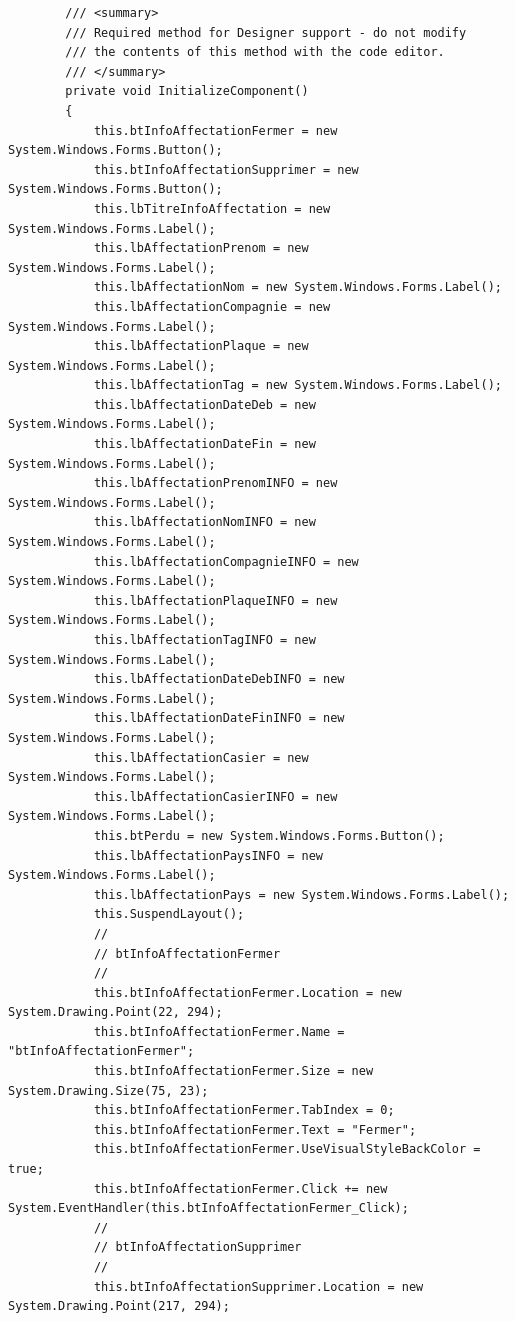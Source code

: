\documentclass[main.tex]{subfiles}
\begin{document}
\begin{lstlisting}
        /// <summary>
        /// Required method for Designer support - do not modify
        /// the contents of this method with the code editor.
        /// </summary>
        private void InitializeComponent()
        {
            this.btInfoAffectationFermer = new System.Windows.Forms.Button();
            this.btInfoAffectationSupprimer = new System.Windows.Forms.Button();
            this.lbTitreInfoAffectation = new System.Windows.Forms.Label();
            this.lbAffectationPrenom = new System.Windows.Forms.Label();
            this.lbAffectationNom = new System.Windows.Forms.Label();
            this.lbAffectationCompagnie = new System.Windows.Forms.Label();
            this.lbAffectationPlaque = new System.Windows.Forms.Label();
            this.lbAffectationTag = new System.Windows.Forms.Label();
            this.lbAffectationDateDeb = new System.Windows.Forms.Label();
            this.lbAffectationDateFin = new System.Windows.Forms.Label();
            this.lbAffectationPrenomINFO = new System.Windows.Forms.Label();
            this.lbAffectationNomINFO = new System.Windows.Forms.Label();
            this.lbAffectationCompagnieINFO = new System.Windows.Forms.Label();
            this.lbAffectationPlaqueINFO = new System.Windows.Forms.Label();
            this.lbAffectationTagINFO = new System.Windows.Forms.Label();
            this.lbAffectationDateDebINFO = new System.Windows.Forms.Label();
            this.lbAffectationDateFinINFO = new System.Windows.Forms.Label();
            this.lbAffectationCasier = new System.Windows.Forms.Label();
            this.lbAffectationCasierINFO = new System.Windows.Forms.Label();
            this.btPerdu = new System.Windows.Forms.Button();
            this.lbAffectationPaysINFO = new System.Windows.Forms.Label();
            this.lbAffectationPays = new System.Windows.Forms.Label();
            this.SuspendLayout();
            // 
            // btInfoAffectationFermer
            // 
            this.btInfoAffectationFermer.Location = new System.Drawing.Point(22, 294);
            this.btInfoAffectationFermer.Name = "btInfoAffectationFermer";
            this.btInfoAffectationFermer.Size = new System.Drawing.Size(75, 23);
            this.btInfoAffectationFermer.TabIndex = 0;
            this.btInfoAffectationFermer.Text = "Fermer";
            this.btInfoAffectationFermer.UseVisualStyleBackColor = true;
            this.btInfoAffectationFermer.Click += new System.EventHandler(this.btInfoAffectationFermer_Click);
            // 
            // btInfoAffectationSupprimer
            // 
            this.btInfoAffectationSupprimer.Location = new System.Drawing.Point(217, 294);

\end{lstlisting}
\end{document}
